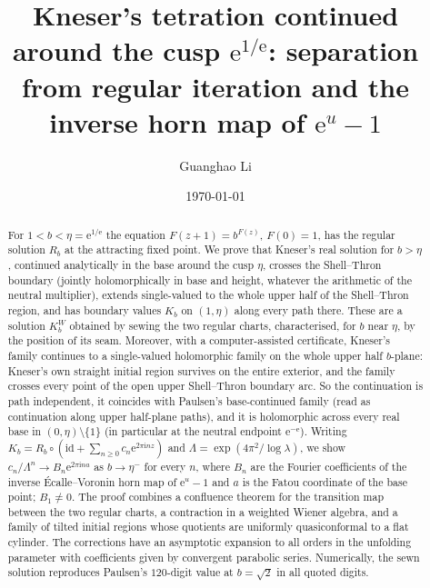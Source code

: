 \documentclass[11pt]{amsart}
\theoremstyle{definition}
\newcommand{\Rr}{R}
\newcommand{\Kk}{K}
\newcommand{\eee}{\mathrm{e}}
\newcommand{\ii}{\mathrm{i}}
\begin{document}
\title[Kneser's tetration around the cusp and the horn map of $\eee^u-1$]{Kneser's tetration continued around the cusp $\eee^{1/\eee}$: separation from regular iteration and the inverse horn map of $\eee^u-1$}

\author{Guanghao Li}

\date{\today}

\begin{abstract}
For $1<b<\eta=\eee^{1/\eee}$ the equation $F(z+1)=b^{F(z)}$, $F(0)=1$, has the
regular solution $\Rr_b$ at the attracting fixed point.  We prove that
Kneser's real solution for $b>\eta$, continued analytically in the base around
the cusp $\eta$, crosses the Shell--Thron boundary (jointly holomorphically in
base and height, whatever the arithmetic of the neutral multiplier), extends
single-valued to the whole upper half of the Shell--Thron region, and has
boundary values $\Kk_b$ on $(1,\eta)$ along every path there.  These are a solution $\Kk^W_b$ obtained by sewing the two regular
charts, characterised, for $b$ near $\eta$, by the position of its seam.  Moreover, with a
computer-assisted certificate, Kneser's family continues to a single-valued
holomorphic family on the whole upper half $b$-plane: Kneser's own straight
initial region survives on the entire exterior, and the family crosses every
point of the open upper Shell--Thron boundary arc.  So the continuation is path
independent, it coincides with Paulsen's base-continued family (read as
continuation along upper half-plane paths), and it is
holomorphic across every real base in $(0,\eta)\setminus\{1\}$ (in particular
at the neutral endpoint $\eee^{-\eee}$).  Writing
$\Kk_b=\Rr_b\circ(\mathrm{id}+\sum_{n\ge0}c_n\eee^{2\pi\ii nz})$ and
$\Lambda=\exp(4\pi^2/\log\lambda)$, we show $c_n/\Lambda^n\to B_n\eee^{2\pi\ii na}$ as
$b\to\eta^-$ for every $n$, where $B_n$ are the Fourier coefficients of the
inverse \'Ecalle--Voronin horn map of $\eee^u-1$ and $a$ is the Fatou coordinate
of the base point; $B_1\ne0$.  The proof combines a confluence theorem for the
transition map between the two regular charts, a contraction in a weighted
Wiener algebra, and a family of tilted initial regions whose quotients are
uniformly quasiconformal to a flat cylinder.  The corrections have an
asymptotic expansion to all orders in the unfolding parameter with
coefficients given by convergent parabolic series.  Numerically, the sewn
solution reproduces Paulsen's $120$-digit value at $b=\sqrt2$ in all quoted
digits.
\end{abstract}
\end{document}
